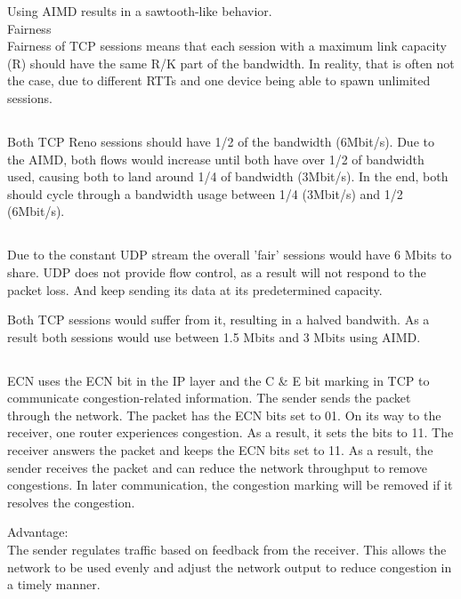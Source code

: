 \documentclass{article}
\begin{document}
    Using AIMD results in a sawtooth-like behavior. \\
    Fairness\\
    Fairness of TCP sessions means that each session with a maximum link capacity (R) should have the same R/K part of the bandwidth. In reality, that is often not the case, due to different RTTs and one device being able to spawn unlimited sessions. 

    \subsection{}
    Both TCP Reno sessions should have 1/2 of the bandwidth (6Mbit/s). Due to the AIMD, both flows would increase until both have over 1/2 of bandwidth used, causing both to land around 1/4 of bandwidth (3Mbit/s). In the end, both should cycle through a bandwidth usage between 1/4 (3Mbit/s) and 1/2 (6Mbit/s). 
    
    \subsection{}
    Due to the constant UDP stream the overall 'fair' sessions would have 6 Mbits to share. UDP does not provide flow control, as a result will not respond to the packet loss. And keep sending its data at its predetermined capacity. 

    Both TCP sessions would suffer from it, resulting in a halved bandwith.
    As a result both sessions would use between 1.5 Mbits and 3 Mbits using AIMD.

    \subsection{}
    ECN uses the ECN bit in the IP layer and the C \& E bit marking in TCP to communicate congestion-related information. 
    The sender sends the packet through the network. The packet has the ECN bits set to 01. On its way to the receiver, one router experiences congestion. As a result, it sets the bits to 11.
    The receiver answers the packet and keeps the ECN bits set to 11. As a result, the sender receives the packet and can reduce the network throughput to remove congestions. 
    In later communication, the congestion marking will be removed if it resolves the congestion. 


    Advantage: \\
    The sender regulates traffic based on feedback from the receiver. This allows the network to be used evenly and adjust the network output to reduce congestion in a timely manner. 
\end{document}
